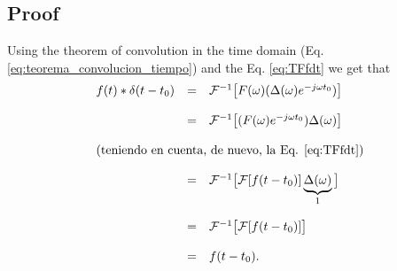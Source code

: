 \subsection*{Proof}
Using the theorem of convolution in the time domain (Eq.
\ref{eq:teorema_convolucion_tiempo}) and the Eq. \ref{eq:TFfdt} we get that
\begin{equation*}
  \begin{array}{rcl}
    f(t)*\delta(t-t_0) & = &
    {\cal F}^{-1}\big[F(\omega)(\Delta(\omega)e^{-j\omega t_0})\big]\\\\
    & = & {\cal F}^{-1}\big[(F(\omega)e^{-j\omega t_0})\Delta(\omega)\big]\\\\
    \multicolumn{3}{l}{\text{(teniendo en cuenta, de nuevo, la Eq. \ref{eq:TFfdt})}}\\\\
    & = & {\cal F}^{-1}\big[{\cal F}[f(t-t_0)]\underbrace{\Delta(\omega)}_{1}\big]\\\\
    & = & {\cal F}^{-1}\big[{\cal F}[f(t-t_0)]\big]\\\\
    & = & f(t-t_0).
  \end{array}
\end{equation*}

%


